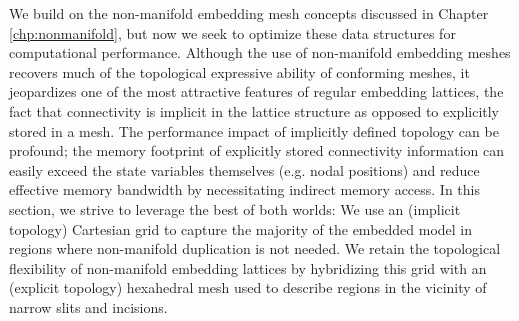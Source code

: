 We build on the non-manifold embedding mesh concepts discussed in
Chapter \ref{chp:nonmanifold}, but now we seek to optimize these
data structures for computational performance. Although the use of
non-manifold embedding meshes recovers much of the topological
expressive ability of conforming meshes, it jeopardizes one of the
most attractive features of regular embedding lattices, the fact that
connectivity is implicit in the lattice structure as opposed to
explicitly stored in a mesh. The performance impact of implicitly
defined topology can be profound; the memory footprint of explicitly
stored connectivity information can easily exceed the state variables
themselves (e.g. nodal positions) and reduce effective memory
bandwidth by necessitating indirect memory access. In this section, we
strive to leverage the best of both worlds: We use an (implicit
topology) Cartesian grid to capture the majority of the embedded model
in regions where non-manifold duplication is not needed. We retain the
topological flexibility of non-manifold embedding lattices by
hybridizing this grid with an (explicit topology) hexahedral mesh used
to describe regions in the vicinity of narrow slits and incisions.








